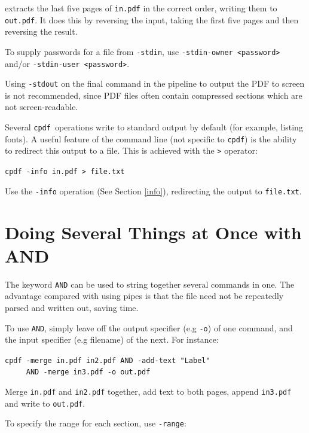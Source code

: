 \documentclass{book}
\newcommand{\cpdf}{\texttt{cpdf}}
\begin{document}
\noindent extracts the last five pages of \texttt{in.pdf} in the correct order,
writing them to \texttt{out.pdf}. It does this by reversing the input, taking
the first five pages and then reversing the result.

To supply passwords for a file from \texttt{-stdin}, use \texttt{-stdin-owner <password>} and/or \texttt{-stdin-user <password>}.

Using \texttt{-stdout} on the final command in the pipeline to output the PDF
to screen is not recommended, since PDF files often contain compressed sections
which are not screen-readable.

Several \cpdf\ operations write to standard output by default (for
example, listing fonts). A useful feature of the command line (not specific to
\cpdf) is the ability to redirect this output to a file. This is
achieved with the \texttt{>} operator:

\begin{framed}
  \noindent\small\verb!cpdf -info in.pdf > file.txt!

  \vspace{2.5mm}
  \noindent Use the \texttt{-info} operation (See Section \ref{info}), redirecting the
output to \texttt{file.txt}.
\end{framed}

\section{Doing Several Things at Once with AND}
The keyword \texttt{AND} can be used to string together several commands in
one. The advantage compared with using pipes is that the file need not be
repeatedly parsed and written out, saving time.

To use \texttt{AND}, simply leave off the output specifier (e.g \texttt{-o}) of
one command, and the input specifier (e.g filename) of the next. For instance:

\begin{framed}
 \noindent \small\verb!cpdf -merge in.pdf in2.pdf AND -add-text "Label"!\\
  \noindent\small\verb!     AND -merge in3.pdf -o out.pdf!

  \vspace{2.5mm}
  \noindent Merge \texttt{in.pdf} and \texttt{in2.pdf} together, add text to both pages, append \texttt{in3.pdf} and write to \texttt{out.pdf}.
\end{framed}

\noindent To specify the range for each section, use \texttt{-range}:
\end{document}
